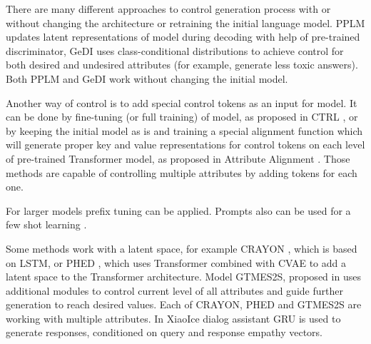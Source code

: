 \documentclass[11pt]{article}
\begin{document}
There are many different approaches to control generation process with or without changing the architecture or retraining the initial language model. PPLM \cite{pplm} updates latent representations of model during decoding with help of pre-trained discriminator, GeDI \cite{gedi} uses class-conditional distributions to achieve control for both desired and undesired attributes (for example, generate less toxic answers). Both PPLM and GeDI work without changing the initial model. 

Another way of control is to add special control tokens as an input for model. It can be done by fine-tuning (or full training) of model, as proposed in CTRL \cite{ctrl}, or by keeping the initial model as is and training a special alignment function which will generate proper key and value representations for control tokens on each level of pre-trained Transformer model, as proposed in Attribute Alignment \cite{attr_alignment}. Those methods are capable of controlling multiple attributes by adding tokens for each one.

For larger models prefix tuning \cite{prefix_tuning} can be applied. Prompts also can be used for a few shot learning \cite{prompt_based_few_shot}.

Some methods work with a latent space, for example CRAYON \cite{hu2021controllable}, which is based on LSTM, or PHED \cite{phed}, which uses Transformer combined with CVAE to add a latent space to the Transformer architecture. Model GTMES2S, proposed in \cite{neural_meta_words} uses additional modules to control current level of all attributes and guide further generation to reach desired values. Each of CRAYON, PHED and GTMES2S are working with multiple attributes. In XiaoIce dialog assistant \cite{zhou2019design} GRU is used to generate responses, conditioned on query and response empathy vectors.
\end{document}
